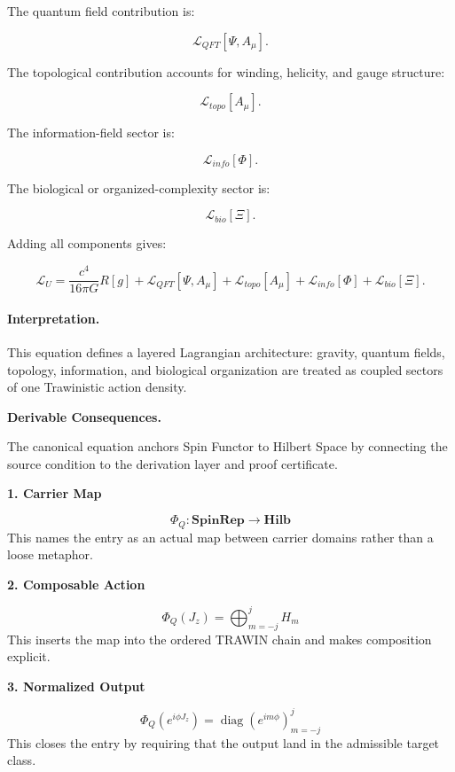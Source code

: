 The quantum field contribution is:

\begin{equation}
\mathcal{L}_{QFT}[\Psi,A_\mu].
\end{equation}

The topological contribution accounts for winding, helicity, and gauge structure:

\begin{equation}
\mathcal{L}_{topo}[A_\mu].
\end{equation}

The information-field sector is:

\begin{equation}
\mathcal{L}_{info}[\Phi].
\end{equation}

The biological or organized-complexity sector is:

\begin{equation}
\mathcal{L}_{bio}[\Xi].
\end{equation}

Adding all components gives:

\begin{equation}
\boxed{
\mathcal{L}_U
=
\frac{c^4}{16\pi G}R[g]
+
\mathcal{L}_{QFT}[\Psi,A_\mu]
+
\mathcal{L}_{topo}[A_\mu]
+
\mathcal{L}_{info}[\Phi]
+
\mathcal{L}_{bio}[\Xi].
}
\end{equation}

\paragraph{Interpretation.}
This equation defines a layered Lagrangian architecture: gravity, quantum fields, topology, information, and biological organization are treated as coupled sectors of one Trawinistic action density.

\par\vspace{0.35em}
\noindent\textbf{Derivable Consequences.}\quad
\begingroup
\footnotesize
\raggedright
The canonical equation anchors Spin Functor to Hilbert Space by connecting the source condition to the derivation layer and proof certificate.
\par\endgroup

\noindent\textbf{1. Carrier Map}\par
\[
\Phi_Q:\mathbf{SpinRep}\to\mathbf{Hilb}
\]
\noindent This names the entry as an actual map between carrier domains rather than a loose metaphor.\par
\noindent\textbf{2. Composable Action}\par
\[
\Phi_Q(J_z)=\bigoplus_{m=-j}^{j}H_m
\]
\noindent This inserts the map into the ordered TRAWIN chain and makes composition explicit.\par
\noindent\textbf{3. Normalized Output}\par
\[
\Phi_Q(e^{i\phi J_z})=\operatorname{diag}(e^{im\phi})_{m=-j}^{j}
\]
\noindent This closes the entry by requiring that the output land in the admissible target class.\par

